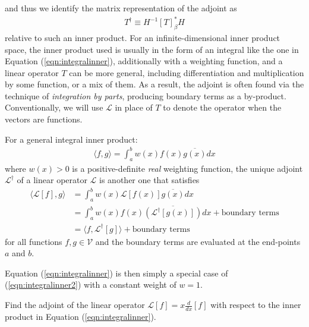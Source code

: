and thus we identify the matrix representation of the adjoint as 
\begin{align}
T^\dag \equiv H^{-1} [T]_\beta^* H    
\end{align} relative to such an inner product. For an infinite-dimensional inner product space, the inner product used is usually in the form of an integral like the one in Equation (\ref{eqn:integralinner}), additionally with a weighting function, and a linear operator $T$ can be more general, including differentiation and multiplication by some function, or a mix of them. As a result, the adjoint is often found via the technique of \textit{integration by parts}, producing boundary terms as a by-product. Conventionally, we will use $\mathcal{L}$ in place of $T$ to denote the operator when the vectors are functions.
\begin{proper}
\label{proper:adjointinnerint}
For a general integral inner product:
\begin{align}
\langle f,g \rangle = \int_a^b w(x) f(x) \overline{g(x)} dx \label{eqn:integralinner2}
\end{align}
where $w(x) > 0$ is a positive-definite \textit{real} weighting function, the unique adjoint $\mathcal{L}^\dagger$ of a linear operator $\mathcal{L}$ is another one that satisfies
\begin{align}
\langle \mathcal{L}[f], g \rangle &= \int_a^b w(x) \mathcal{L}[f(x)] \overline{g(x)} dx \nonumber \\ 
&= \int_a^b w(x) f(x) \overline{(\mathcal{L^\dag}[g(x)])} dx + \text{boundary terms} \nonumber \\
&= \langle f, \mathcal{L}^\dag[g] \rangle + \text{boundary terms}
\end{align}
for all functions $f, g \in \mathcal{V}$ and the boundary terms are evaluated at the end-points $a$ and $b$.
\end{proper}
Equation (\ref{eqn:integralinner}) is then simply a special case of (\ref{eqn:integralinner2}) with a constant weight of $w = 1$.
\begin{exmp}
Find the adjoint of the linear operator $\mathcal{L}[f] = x\frac{d}{dx}[f]$ with respect to the inner product in Equation (\ref{eqn:integralinner}).
\end{exmp}
